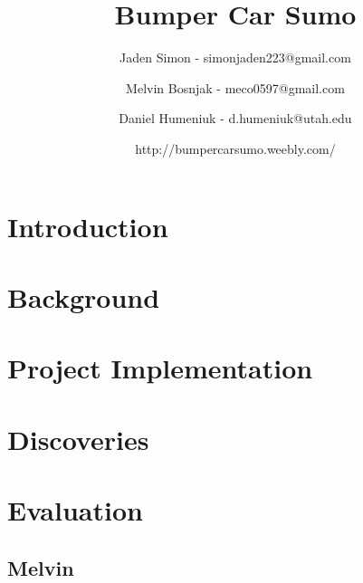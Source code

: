\documentclass[11pt]{ieeeconf}
\title{Bumper Car Sumo}
\author{Jaden Simon - simonjaden223@gmail.com \\ \and
	   Melvin Bosnjak - meco0597@gmail.com \\ \and
	   Daniel Humeniuk - d.humeniuk@utah.edu \\ \and
	   http://bumpercarsumo.weebly.com/}
\begin{document}
\maketitle

\begin{abstract}

\end{abstract}

\section{Introduction}

\section{Background}

\section{Project Implementation}

\section{Discoveries}

\section{Evaluation}

\subsection{Melvin}
\end{document}
